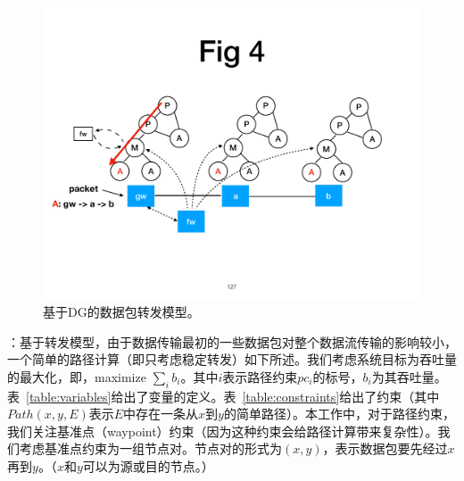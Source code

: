 \documentclass{ctexart}
\newcommand{\para}[1]{\noindent {\bf #1}}%
\begin{document}
\begin{figure}[!htbp]
\centering
      \centering\includegraphics[width=\linewidth]{figures/ss-127.pdf}
\caption{基于DG的数据包转发模型。}
\label{fig:pfm-example}
\end{figure}

\para{系统目标}：基于转发模型，由于数据传输最初的一些数据包对整个数据流传输的影响较小，一个简单的路径计算（即只考虑稳定转发）如下所述。我们考虑系统目标为吞吐量的最大化，即，maximize $\sum_ib_i$。其中$i$表示路径约束$pc_i$的标号，$b_i$为其吞吐量。表~\ref{table:variables}给出了变量的定义。表~\ref{table:constraints}给出了约束（其中$Path(x, y, E)$表示$E$中存在一条从$x$到$y$的简单路径）。本工作中，对于路径约束，我们关注基准点（waypoint）约束（因为这种约束会给路径计算带来复杂性）。我们考虑基准点约束为一组节点对。节点对的形式为$(x, y)$，表示数据包要先经过$x$再到$y$。（$x$和$y$可以为源或目的节点。）

\end{document}
